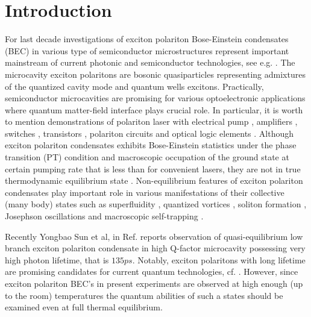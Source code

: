 \documentclass[aps, pre, preprint, groupedaddress, superscriptaddress, showkeys, showpacs] {revtex4-1}
\begin{document}
\pacs{\dots}
\keywords{\dots}

\maketitle

\newcommand{\sn}{\textrm{sn}}
\newcommand{\cn}{\textrm{cn}}
\newcommand{\dn}{\textrm{dn}}
\newcommand{\sd}{\textrm{sd}}
\newcommand{\cd}{\textrm{cd}}
\newcommand{\nd}{\textrm{nd}}
\newcommand{\am}{\textrm{am}}

\newcommand{\red}{\color{red}}

\section{Introduction \label{sec:introduction}}

For last decade investigations of exciton polariton Bose-Einstein condensates (BEC) in various type of semiconductor microstructures represent important mainstream of current photonic and semiconductor technologies, see e.g. \cite{Sanvitto,Guillet}.
The microcavity exciton polaritons are bosonic quasiparticles representing  admixtures of the quantized cavity mode and quantum wells excitons.
Practically, semiconductor microcavities are promising for various optoelectronic applications where quantum  matter-field interface plays crucial role.
In particular, it is worth to mention demonstrations of polariton laser with electrical pump \cite{Bhattacharya,Schneider}, amplifiers \cite{Niemietz}, switches \cite{Amo_2010}, transistors \cite{Ballarini}, polariton circuits and optical logic elements \cite{Sturm,Liew}.
Although exciton polariton condensates exhibits Bose-Einstein statistics under the phase transition (PT) condition and macroscopic occupation of the ground state at certain pumping rate that is less than for convenient lasers, they are not in true thermodynamic equilibrium state \cite{Byrnes_2014,Sun}. Non-equilibrium features of exciton polariton condensates play important role in various manifestations of their collective (many body) states such as superfluidity \cite{Carusotto_2013,Amo_2009}, quantized vortices \cite{Lagoudakis_2008,Lagoudakis_2009}, soliton formation \cite{Sich}, Josephson oscillations and macroscopic self-trapping \cite{Abbarchi,Lagoudakis_2010}.

Recently Yongbao Sun et al,  in Ref. \cite{Snoke_2017} reports observation of quasi-equilibrium low branch exciton polariton condensate in high Q-factor microcavity possessing very high photon lifetime, that is $135ps$. Notably, exciton polaritons with long lifetime are promising candidates for current quantum technologies, cf. \cite{Demirchyan}. However, since exciton polariton BEC's in present experiments are observed at high enough (up to the room) temperatures the quantum abilities of such a states should be examined even at full thermal equilibrium. 
    
\end{document}
